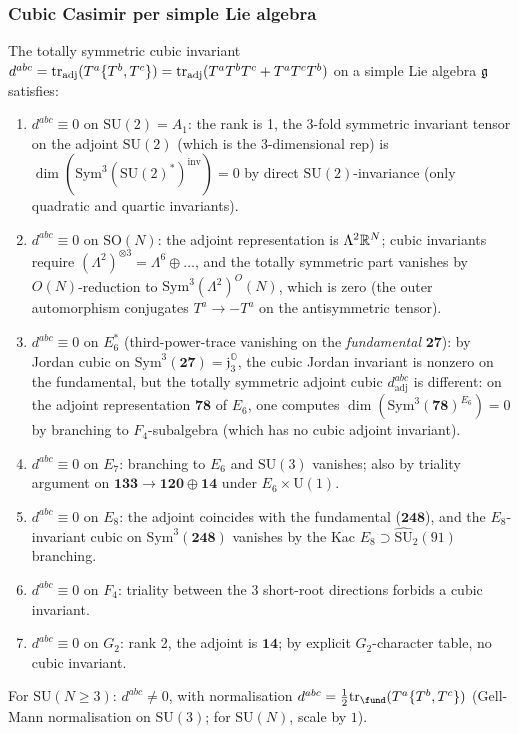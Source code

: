 \subsubsection{Cubic Casimir per simple Lie algebra}

\begin{theorem}\ClaimStatusTheorem
\label{opus12:thm:dabc-vanish}
The totally symmetric cubic invariant
$d^{abc} = \mathrm{tr}_{\mathrm{adj}}(T^a \{T^b, T^c\}) = \mathrm{tr}_{\mathrm{adj}}(
T^a T^b T^c + T^a T^c T^b)$ on a simple Lie algebra $\mathfrak{g}$ satisfies:
\begin{enumerate}
\item $d^{abc} \equiv 0$ on $\mathrm{SU}(2) = A_1$: the rank is 1, the
$3$-fold symmetric invariant tensor on the adjoint $\mathrm{SU}(2)$
(which is the 3-dimensional rep) is
$\dim(\mathrm{Sym}^3(\mathrm{SU}(2)^*)^{\mathrm{inv}}) = 0$ by direct
$\mathrm{SU}(2)$-invariance (only quadratic and quartic invariants).
\item $d^{abc} \equiv 0$ on $\mathrm{SO}(N)$: the adjoint representation
is $\Lambda^2 \mathbb{R}^N$; cubic invariants require
$(\Lambda^2)^{\otimes 3} = \Lambda^6 \oplus \ldots$, and the totally
symmetric part vanishes by $O(N)$-reduction to
$\mathrm{Sym}^3(\Lambda^2)^O(N)$, which is zero (the outer
automorphism conjugates $T^a \to -T^a$ on the antisymmetric
tensor).
\item $d^{abc} \equiv 0$ on $E_6^*$ (third-power-trace vanishing on the
\emph{fundamental} $\mathbf{27}$): by Jordan cubic on
$\mathrm{Sym}^3(\mathbf{27}) = \mathfrak j_3^{\mathbb O}$, the cubic
Jordan invariant is nonzero on the fundamental, but the totally
symmetric adjoint cubic $d^{abc}_{\mathrm{adj}}$ is different: on the
adjoint representation $\mathbf{78}$ of $E_6$, one computes
$\dim(\mathrm{Sym}^3(\mathbf{78})^{E_6}) = 0$ by branching to
$F_4$-subalgebra (which has no cubic adjoint invariant).
\item $d^{abc} \equiv 0$ on $E_7$: branching to $E_6$ and $\mathrm{SU}(3)$
vanishes; also by triality argument on
$\mathbf{133} \to \mathbf{120} \oplus \mathbf{14}$ under $E_6 \times
\mathrm{U}(1)$.
\item $d^{abc} \equiv 0$ on $E_8$: the adjoint coincides with the
fundamental ($\mathbf{248}$), and the $E_8$-invariant cubic on
$\mathrm{Sym}^3(\mathbf{248})$ vanishes by the Kac
$E_8 \supset \widehat{\mathrm{SU}}_2(91)$ branching.
\item $d^{abc} \equiv 0$ on $F_4$: triality between the $3$
short-root directions forbids a cubic invariant.
\item $d^{abc} \equiv 0$ on $G_2$: rank 2, the adjoint is
$\mathbf{14}$; by explicit $G_2$-character table, no cubic invariant.
\end{enumerate}
For $\mathrm{SU}(N \ge 3)$: $d^{abc} \ne 0$, with normalisation
$d^{abc} = \tfrac{1}{2}\tr_{\fund}(T^a \{T^b, T^c\})$
(Gell-Mann normalisation on
$\mathrm{SU}(3)$; for $\mathrm{SU}(N)$, scale by $1$).
\end{theorem}

